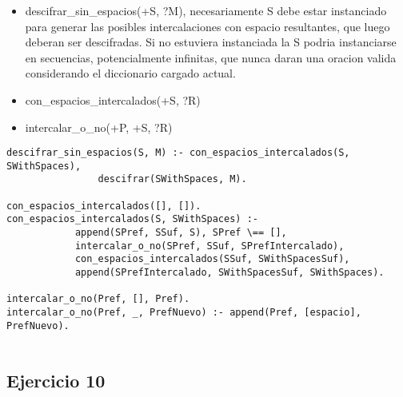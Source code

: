 \documentclass[spanish, 10pt,a4paper]{article}
\numberwithin{equation}{section} %
\begin{document}
\begin{itemize}
\item descifrar\_sin\_espacios(+S, ?M), necesariamente S debe estar instanciado para generar las posibles intercalaciones con espacio resultantes, que luego deberan ser descifradas.
Si no estuviera instanciada la S podria instanciarse en secuencias, potencialmente infinitas, que nunca daran una oracion valida considerando el diccionario cargado actual.
\item con\_espacios\_intercalados(+S, ?R)
\item intercalar\_o\_no(+P, +S, ?R)
\end{itemize}
\begin{lstlisting}
descifrar_sin_espacios(S, M) :- con_espacios_intercalados(S, SWithSpaces),  
				descifrar(SWithSpaces, M).

con_espacios_intercalados([], []).
con_espacios_intercalados(S, SWithSpaces) :- 
			append(SPref, SSuf, S), SPref \== [], 
			intercalar_o_no(SPref, SSuf, SPrefIntercalado), 
			con_espacios_intercalados(SSuf, SWithSpacesSuf), 
			append(SPrefIntercalado, SWithSpacesSuf, SWithSpaces).

intercalar_o_no(Pref, [], Pref). 
intercalar_o_no(Pref, _, PrefNuevo) :- append(Pref, [espacio], PrefNuevo).
											 
\end{lstlisting}


\subsection{Ejercicio 10}
\end{document}
